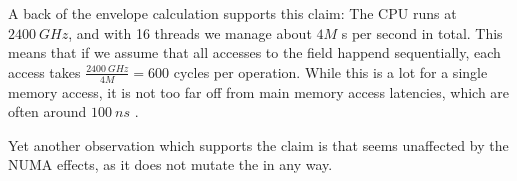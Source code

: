 A back of the envelope calculation supports this claim: The CPU runs at $\SI{2400}{GHz}$, and with
16 threads we manage about $4M$ s per second in total. This means that if we assume
that all accesses to the  field happend sequentially, each access takes
$\frac{\SI{2400}{GHz}}{4M} = 600$ cycles per operation. While this is a lot for a single memory
access, it is not too far off from main memory access latencies, which are often around
$\SI{100}{ns}$ \cite{memlatency}.

Yet another observation which supports the claim is that  seems unaffected by the
NUMA effects, as it does not mutate the  in any way.
